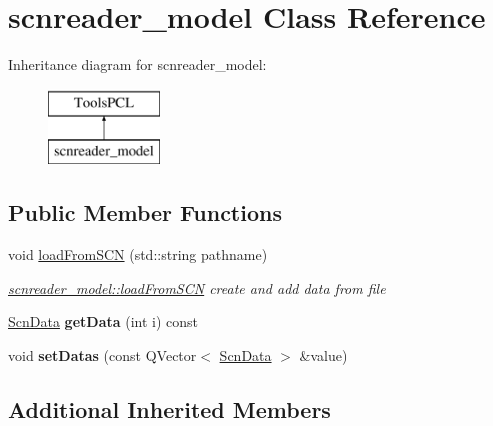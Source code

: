 \hypertarget{classscnreader__model}{\section{scnreader\-\_\-model Class Reference}
\label{classscnreader__model}
}
Inheritance diagram for scnreader\-\_\-model\-:\begin{figure}[H]
\begin{center}
\leavevmode
\includegraphics[height=2.000000cm]{classscnreader__model}
\end{center}
\end{figure}
\subsection*{Public Member Functions}
\begin{DoxyCompactItemize}
\item 
void \hyperlink{classscnreader__model_ad40c19b946f2299d290adc7c4acc9a13}{load\-From\-S\-C\-N} (std\-::string pathname)
\begin{DoxyCompactList}\small\item\em \hyperlink{classscnreader__model_ad40c19b946f2299d290adc7c4acc9a13}{scnreader\-\_\-model\-::load\-From\-S\-C\-N} create and add data from file \end{DoxyCompactList}\item 
\hypertarget{classscnreader__model_a6c2fae26489c9f8b43aca8775413732d}{\hyperlink{classScnData}{Scn\-Data} {\bfseries get\-Data} (int i) const }\label{classscnreader__model_a6c2fae26489c9f8b43aca8775413732d}

\item 
\hypertarget{classscnreader__model_a5371eaafd61ea9b18d04ac11e5e03218}{void {\bfseries set\-Datas} (const Q\-Vector$<$ \hyperlink{classScnData}{Scn\-Data} $>$ \&value)}\label{classscnreader__model_a5371eaafd61ea9b18d04ac11e5e03218}

\end{DoxyCompactItemize}
\subsection*{Additional Inherited Members}


